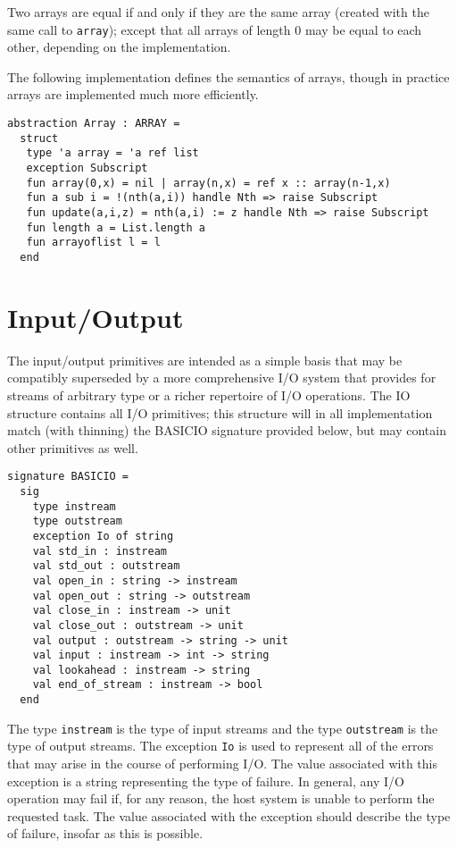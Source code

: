 Two arrays are equal if and only if they are the same array (created
with the same call to \verb"array"); except that all arrays of length
0 may be equal to each other, depending on the implementation.

The following implementation defines the semantics of arrays, though
in practice arrays are implemented much more efficiently.
\begin{verbatim}
abstraction Array : ARRAY =
  struct
   type 'a array = 'a ref list
   exception Subscript
   fun array(0,x) = nil | array(n,x) = ref x :: array(n-1,x)
   fun a sub i = !(nth(a,i)) handle Nth => raise Subscript
   fun update(a,i,z) = nth(a,i) := z handle Nth => raise Subscript
   fun length a = List.length a
   fun arrayoflist l = l
  end
\end{verbatim}
\section{Input/Output}
The input/output primitives are intended as a simple basis that may
be compatibly superseded by a more comprehensive I/O system that
provides for streams of arbitrary type or a richer repertoire of I/O
operations.  The IO structure contains all I/O primitives; this
structure will in all implementation
match (with thinning) the BASICIO signature provided
below, but may contain other primitives as well.

\begin{verbatim}
signature BASICIO = 
  sig
    type instream 
    type outstream
    exception Io of string
    val std_in : instream
    val std_out : outstream
    val open_in : string -> instream
    val open_out : string -> outstream
    val close_in : instream -> unit
    val close_out : outstream -> unit
    val output : outstream -> string -> unit
    val input : instream -> int -> string
    val lookahead : instream -> string
    val end_of_stream : instream -> bool
  end

\end{verbatim}
The type \verb"instream" is the type of input streams and the type
\verb"outstream" is the type of output streams.  The exception
\verb"Io" is used to represent all of the errors that may
arise in the course of performing I/O.  The value associated with
this exception is a string representing the type of failure.  In
general, any I/O operation may fail if, for any reason, the host
system is unable to perform the requested task.  The value associated
with the exception should describe the type of failure, insofar as
this is possible.

